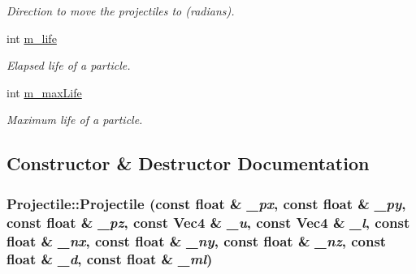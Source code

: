 \begin{DoxyCompactItemize}
\begin{DoxyCompactList}\small\item\em Direction to move the projectiles to (radians). \item\end{DoxyCompactList}\item 
\hypertarget{classProjectile_a9a382b56ddfaf2b96358db02cec0b794}{
int \hyperlink{classProjectile_a9a382b56ddfaf2b96358db02cec0b794}{m\_\-life}}
\label{classProjectile_a9a382b56ddfaf2b96358db02cec0b794}

\begin{DoxyCompactList}\small\item\em Elapsed life of a particle. \item\end{DoxyCompactList}\item 
\hypertarget{classProjectile_ab6dd4a4ce9ad5c436fdd0c789996d232}{
int \hyperlink{classProjectile_ab6dd4a4ce9ad5c436fdd0c789996d232}{m\_\-maxLife}}
\label{classProjectile_ab6dd4a4ce9ad5c436fdd0c789996d232}

\begin{DoxyCompactList}\small\item\em Maximum life of a particle. \item\end{DoxyCompactList}\end{DoxyCompactItemize}


\subsection{Constructor \& Destructor Documentation}
\hypertarget{classProjectile_ab1e373ca8aa5c3c064b272634167be30}{
\subsubsection[{Projectile}]{\setlength{\rightskip}{0pt plus 5cm}Projectile::Projectile (const float \& {\em \_\-px}, \/  const float \& {\em \_\-py}, \/  const float \& {\em \_\-pz}, \/  const {\bf Vec4} \& {\em \_\-u}, \/  const {\bf Vec4} \& {\em \_\-l}, \/  const float \& {\em \_\-nx}, \/  const float \& {\em \_\-ny}, \/  const float \& {\em \_\-nz}, \/  const float \& {\em \_\-d}, \/  const float \& {\em \_\-ml})}}
\label{classProjectile_ab1e373ca8aa5c3c064b272634167be30}


